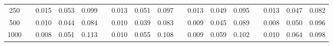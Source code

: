 % 
\begin{tabular}{ccccccccccccccccc}
  \hline
  \hline
250 &  & 0.015 & 0.053 & 0.099 &  & 0.013 & 0.051 & 0.097 &  & 0.013 & 0.049 & 0.095 &  & 0.013 & 0.047 & 0.082 \\ 
  500 &  & 0.010 & 0.044 & 0.084 &  & 0.010 & 0.039 & 0.083 &  & 0.009 & 0.045 & 0.089 &  & 0.008 & 0.050 & 0.096 \\ 
  1000 &  & 0.008 & 0.051 & 0.113 &  & 0.010 & 0.055 & 0.108 &  & 0.009 & 0.059 & 0.102 &  & 0.010 & 0.064 & 0.098 \\ 
   \hline
\end{tabular}

